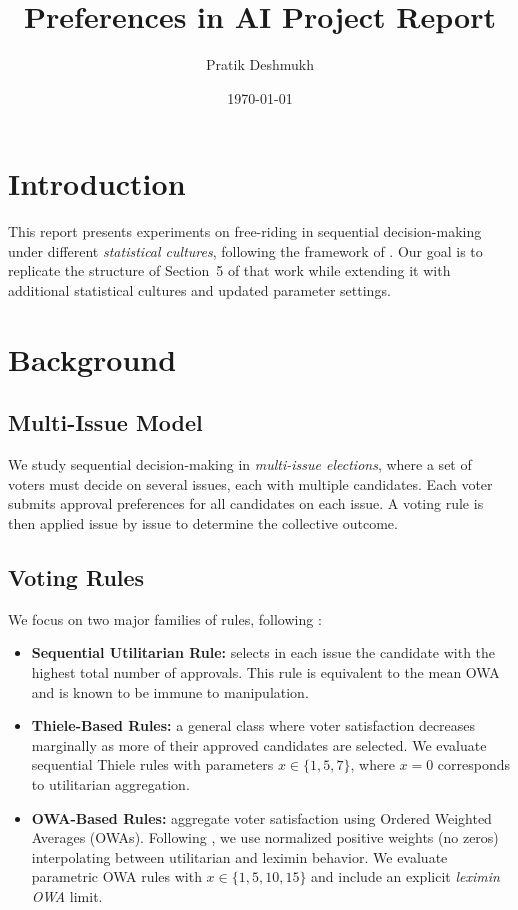 \documentclass[11pt]{article}
\title{Preferences in AI Project Report}
\author{Pratik Deshmukh}
\date{\today}
\begin{document}
\maketitle

\section{Introduction}
This report presents experiments on free-riding in sequential decision-making
under different \emph{statistical cultures}, following the framework of
\cite{lackner2023freeriding}. Our goal is to replicate the structure of Section~5
of that work while extending it with additional statistical cultures and updated
parameter settings.

\section{Background}

\subsection{Multi-Issue Model}
We study sequential decision-making in \emph{multi-issue elections}, where a set
of voters must decide on several issues, each with multiple candidates. Each
voter submits approval preferences for all candidates on each issue. A voting
rule is then applied issue by issue to determine the collective outcome.

\subsection{Voting Rules}
We focus on two major families of rules, following \cite{lackner2023freeriding}:

\begin{itemize}
    \item \textbf{Sequential Utilitarian Rule:} selects in each issue the
    candidate with the highest total number of approvals. This rule is
    equivalent to the mean OWA and is known to be immune to manipulation.
    \item \textbf{Thiele-Based Rules:} a general class where voter satisfaction
    decreases marginally as more of their approved candidates are selected.
    We evaluate sequential Thiele rules with parameters $x \in \{1,5,7\}$,
    where $x=0$ corresponds to utilitarian aggregation.
    \item \textbf{OWA-Based Rules:} aggregate voter satisfaction using Ordered
    Weighted Averages (OWAs). Following \cite{lackner2023freeriding}, we use
    normalized positive weights (no zeros) interpolating between utilitarian
    and leximin behavior. We evaluate parametric OWA rules with
    $x \in \{1,5,10,15\}$ and include an explicit \emph{leximin OWA} limit.
\end{itemize}
\end{document}
